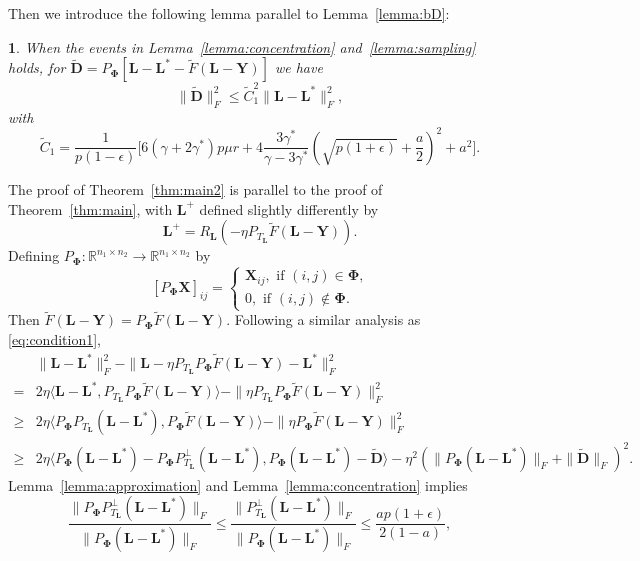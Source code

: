 \documentclass[12pt]{article}
\newcommand{\bX}{\boldsymbol{X}}
\newcommand{\bL}{\boldsymbol{L}}
\newcommand{\bD}{\boldsymbol{D}}
\def\reals{\mathbb{R}}
\def\bY{\boldsymbol{Y}}
\theoremstyle{plain}
\newtheorem{lem}{\protect\lemmaname}
\theoremstyle{definition}
\theoremstyle{plain}
\theoremstyle{plain}
\theoremstyle{remark}
\providecommand{\lemmaname}{Lemma}
\begin{document}
Then we introduce the following lemma parallel to Lemma~\ref{lemma:bD}:


\begin{lem}\label{lemma:bD2}
When the events in Lemma~\ref{lemma:concentration} and~\ref{lemma:sampling} holds, for  $\tilde{\bD}=P_{\mathbf{\Phi}}[\bL-\bL^*-\tilde{F}(\bL-\bY)]$ we have
\begin{equation}\label{eq:second_bound2}
\|\tilde{\bD}\|_F^2\leq \tilde{C}_1^2\|\bL-\bL^*\|_F^2,
\end{equation}
with \[\tilde{C}_1=\frac{1}{p(1-\epsilon)}\Big[6(\gamma+2\gamma^*)p\mu r+4\frac{3\gamma^*}{\gamma-3\gamma^*}(\sqrt{p(1+\epsilon)}+\frac{a}{2})^2+a^2\Big].\]
\end{lem}

The proof of Theorem~\ref{thm:main2} is parallel to the proof of Theorem~\ref{thm:main}, with $\bL^+$ defined slightly differently by
\[
\bL^+=R_{\bL}(-\eta P_{T_{\bL}}\tilde{F}(\bL-\bY)).
\]
Defining $P_{\mathbf{\Phi}}: \reals^{n_1\times n_2}\rightarrow \reals^{n_1\times n_2}$ by
\[
[P_{\mathbf{\Phi}} \bX]_{ij}=\begin{cases}\bX_{ij},\,\,\text{if $(i,j)\in\mathbf{\Phi}$,}\\0,\,\,\text{if $(i,j)\notin\mathbf{\Phi}$.}\end{cases}
\]
Then $\tilde{F}(\bL-\bY)=P_{\mathbf{\Phi}}\tilde{F}(\bL-\bY)$. Following a similar analysis as \eqref{eq:condition1}, 
\begin{align}\nonumber
&\|\bL-\bL^*\|_F^2-\|\bL-\eta P_{T_{\bL}}P_{\mathbf{\Phi}} \tilde{F}(\bL-\bY)-\bL^*\|_F^2 \\\nonumber
=&2 \eta\langle\bL-\bL^*,P_{T_{\bL}}P_{\mathbf{\Phi}} \tilde{F}(\bL-\bY)\rangle-\|\eta P_{T_{\bL}}P_{\mathbf{\Phi}} \tilde{F}(\bL-\bY)\|_F^2\\\nonumber
\geq & 2 \eta\langle P_{\mathbf{\Phi}} P_{T_{\bL}}(\bL-\bL^*),P_{\mathbf{\Phi}} \tilde{F}(\bL-\bY)\rangle-\|\eta P_{\mathbf{\Phi}} \tilde{F}(\bL-\bY)\|_F^2\\
\geq & 2 \eta\langle P_{\mathbf{\Phi}}(\bL-\bL^*)-P_{\mathbf{\Phi}} P_{T_{\bL}}^\perp(\bL-\bL^*),P_{\mathbf{\Phi}}(\bL-\bL^*)-\tilde{\bD}\rangle-\eta^2(\| P_{\mathbf{\Phi}}(\bL-\bL^*)\|_F+\|\tilde{\bD}\|_F)^2
.\label{eq:condition1c}
\end{align}
Lemma~\ref{lemma:approximation} and Lemma~\ref{lemma:concentration} implies
\[
\frac{\|P_{\mathbf{\Phi}} P_{T_{\bL}}^\perp(\bL-\bL^*)\|_F}{\|P_{\mathbf{\Phi}} (\bL-\bL^*)\|_F}\leq \frac{\|P_{T_{\bL}}^\perp(\bL-\bL^*)\|_F}{\|P_{\mathbf{\Phi}} (\bL-\bL^*)\|_F}\leq  \frac{ap(1+\epsilon)}{2(1-a)},
\]
\end{document}
